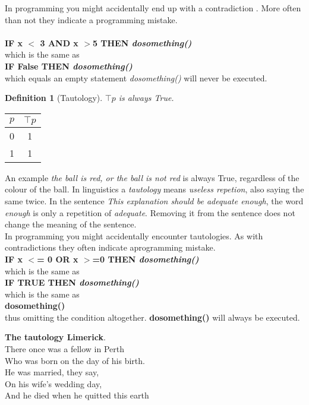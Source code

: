 \documentclass[10pt,a4paper,draft,titlepage,onecolumn]{book}
\newtheorem{definition}{Definition}[section]
\begin{document}
In programming you might accidentally end up with a contradiction . More often than not they indicate a programming mistake. \\ \\
\textbf{IF x $<$ 3 AND  x $>$5  THEN \textit{dosomething()}}\\
which is the same as \\
\textbf{IF False THEN \textit{dosomething()}}\\
which equals an empty statement \textit{dosomething()} will never be executed.
\begin{definition}[Tautology]
$\top p $ is always True.
\end{definition}
\begin{center}
\begin{tabular}{ |c|c| }
 \hline
 $p$ & $\top p$  \\
 \hline
 0 & 1 \\
 1 & 1\\
 \hline
\end{tabular} 
\end{center} 
An example \textit{the ball is red, or the ball is not red} is always True, regardless of the colour of the ball.
In linguistics a \textit {tautology} means \textit{useless repetion}, also {saying the same twice}. In the sentence \textit{This explanation should be adequate enough}, the word \textit{enough} is only a repetition of \textit{adequate}. Removing it from the sentence does not change the meaning of the sentence. \\
In programming you might accidentally encounter tautologies. As with contradictions they often indicate aprogramming mistake. \\
\textbf{IF x $<$= 0 OR  x $>$=0 THEN \textit{dosomething()}}\\
which is the same as \\
\textbf{IF TRUE THEN \textit{dosomething()}}\\
which is the same as \\
\textbf{dosomething()}\\
thus omitting the condition altogether. \textbf{dosomething()} will always be executed.

\begin{center} 
\textbf{The tautology Limerick}.\\
There once was a fellow in Perth \\
Who was born on the day of his birth. \\
He was married, they say, \\
On his wife's wedding day, \\
And he died when he quitted this earth 
\end{center}
\end{document}
